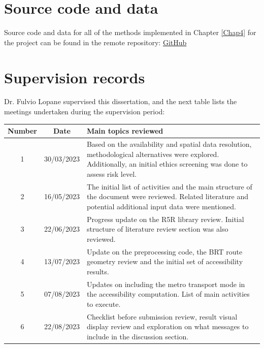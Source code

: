 \documentclass[12pt, a4paper]{report}
\begin{document}
\renewcommand{\bibname}{References}

%

\begin{appendices}
\chapter{Source code and data} \label{Source_Code}
Source code and data for all of the methods implemented in Chapter \ref{Chap4} for the project can be found in the remote repository: \href{https://github.com/rpoandres/MSc_USS_Dissertation}{GitHub}


\chapter{Supervision records}

Dr. Fulvio Lopane supervised this dissertation, and the next table lists the meetings undertaken during the supervision period:

\begin{table}[h]
\centering
\begin{tabular}{|c|c|p{6cm}|}
\hline
\textbf{Number} & \textbf{Date} & \textbf{Main topics reviewed}                                                                                      \\ \hline
1 &
  30/03/2023 &
  Based on the availability and spatial data resolution, methodological alternatives were explored. Additionally, an initial ethics screening was done to assess risk level. \\ \hline
2 &
  16/05/2023 & The initial list of activities and the main structure of the document were reviewed. Related literature and potential additional input data were mentioned.\\ \hline
3               & 22/06/2023    & Progress update on the R5R library review. Initial structure of literature review section was also reviewed.       \\ \hline
4               & 13/07/2023    & Update on the preprocessing code, the BRT route geometry review and the initial set of accessibility results.         \\ \hline
5               & 07/08/2023    & Updates on including the metro transport mode in the accessibility computation. List of main activities to execute. \\ \hline
6 &
  \multicolumn{1}{l|}{22/08/2023} &
  Checklist before submission review, result visual display review and exploration on what messages to include in the discussion section. \\ \hline
\end{tabular}
\end{table}





\end{appendices}
\end{document}
